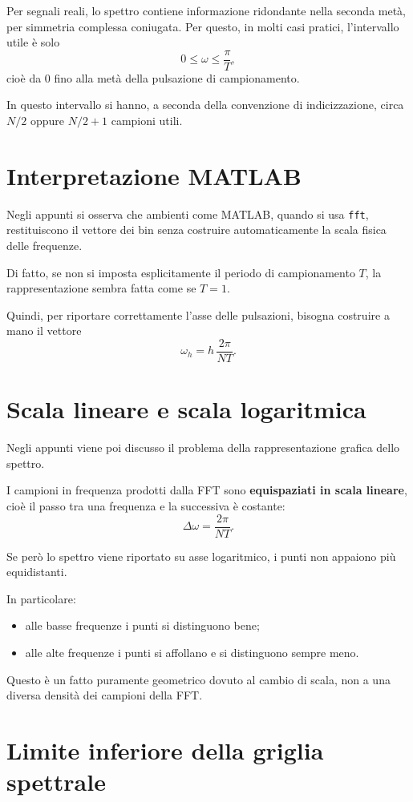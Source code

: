 Per segnali reali, lo spettro contiene informazione ridondante nella seconda metà,
per simmetria complessa coniugata.
Per questo, in molti casi pratici, l'intervallo utile è solo
\[
0\le \omega \le \frac{\pi}{T},
\]
cioè da \(0\) fino alla metà della pulsazione di campionamento.

In questo intervallo si hanno, a seconda della convenzione di indicizzazione,
circa \(N/2\) oppure \(N/2+1\) campioni utili.

\section{Interpretazione MATLAB}

Negli appunti si osserva che ambienti come MATLAB, quando si usa \texttt{fft},
restituiscono il vettore dei bin senza costruire automaticamente la scala fisica delle frequenze.

Di fatto, se non si imposta esplicitamente il periodo di campionamento \(T\),
la rappresentazione sembra fatta come se \(T=1\).

Quindi, per riportare correttamente l'asse delle pulsazioni,
bisogna costruire a mano il vettore
\[
\omega_h = h\,\frac{2\pi}{NT}.
\]

\section{Scala lineare e scala logaritmica}

Negli appunti viene poi discusso il problema della rappresentazione grafica dello spettro.

I campioni in frequenza prodotti dalla FFT sono \textbf{equispaziati in scala lineare},
cioè il passo tra una frequenza e la successiva è costante:
\[
\Delta\omega = \frac{2\pi}{NT}.
\]

Se però lo spettro viene riportato su asse logaritmico, i punti non appaiono più equidistanti.

In particolare:
\begin{itemize}
    \item alle basse frequenze i punti si distinguono bene;
    \item alle alte frequenze i punti si affollano e si distinguono sempre meno.
\end{itemize}

Questo è un fatto puramente geometrico dovuto al cambio di scala,
non a una diversa densità dei campioni della FFT.

\section{Limite inferiore della griglia spettrale}

